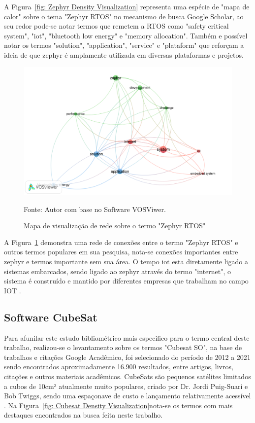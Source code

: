 A Figura~\ref{fig: Zephyr Density Visualization} representa uma espécie de "mapa de calor" sobre o 
tema "Zephyr RTOS" no mecanismo de busca Google Scholar, ao seu redor pode-se notar termos que 
remetem a RTOS como "safety critical system", "iot", "bluetooth low energy" e "memory allocation". 
Também e possível notar os termos "solution", "application", "service" e "plataform" que reforçam a 
ideia de que zephyr é amplamente utilizada em diversas plataformas e projetos\cite{nyffenegger2020connecting}.

\begin{figure}[H]
	\centering
	\includegraphics[width=15cm]{imagens/Zephyr_RTOS_Network_visualization.png}
	\caption{Mapa de visualização de rede sobre o termo "Zephyr RTOS"}
	Fonte: Autor com base no Software VOSViwer.
	\label{fig: Zephyr Network Visualization}
\end{figure}

A Figura~\ref{fig: Zephyr Network Visualization} demonstra uma rede de conexões entre o termo "Zephyr RTOS" 
e outros termos populares em sua pesquisa, nota-se conexões importantes entre zephyr e termos importante sem 
sua área. O tempo iot esta diretamente ligado a sistemas embarcados, sendo ligado ao zephyr através do termo 
"internet", o sistema é construído e mantido por diferentes empresas que trabalham no campo IOT 
\cite{huber_porting_2019}.


\subsection{Software CubeSat}
Para afunilar este estudo bibliométrico mais especifico para o termo central deste trabalho, realizou-se o 
levantamento sobre os termos "Cubesat SO", na base de trabalhos e citações Google Acadêmico, foi selecionado 
do período de 2012 a 2021 sendo encontrados aproximadamente 16.900 resultados, entre artigos, livros, 
citações e outros materiais acadêmicos. CubeSats são pequenos satélites limitados a cubos de 10cm³ atualmente 
muito populares, criado por Dr. Jordi Puig-Suari e Bob Twiggs, sendo uma espaçonave de custo e lançamento 
relativamente acessível \cite{Manyak2011FaultTA}. Na Figura~\ref{fig: Cubesat Density Visualization}nota-se 
os termos com mais destaques encontrados na busca feita neste trabalho.


